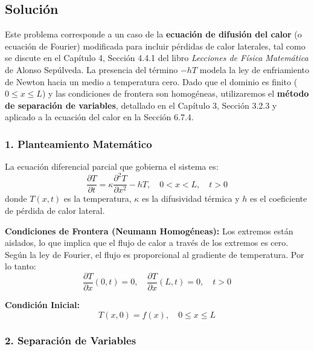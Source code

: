 \documentclass[a4paper]{article}
\begin{document}
\subsection{Solución}

Este problema corresponde a un caso de la \textbf{ecuación de difusión del calor} (o ecuación de Fourier) modificada para incluir pérdidas de calor laterales, tal como se discute en el Capítulo 4, Sección 4.4.1 del libro \textit{Lecciones de Física Matemática} de Alonso Sepúlveda. La presencia del término $-hT$ modela la ley de enfriamiento de Newton hacia un medio a temperatura cero. Dado que el dominio es finito ($0 \leq x \leq L$) y las condiciones de frontera son homogéneas, utilizaremos el \textbf{método de separación de variables}, detallado en el Capítulo 3, Sección 3.2.3 y aplicado a la ecuación del calor en la Sección 6.7.4.

\subsubsection{1. Planteamiento Matemático}

La ecuación diferencial parcial que gobierna el sistema es:
\begin{equation}
\frac{\partial T}{\partial t} = \kappa \frac{\partial^2 T}{\partial x^2} - hT, \quad 0 < x < L, \quad t > 0
\label{eq:pde}
\end{equation}
donde $T(x,t)$ es la temperatura, $\kappa$ es la difusividad térmica y $h$ es el coeficiente de pérdida de calor lateral.

\textbf{Condiciones de Frontera (Neumann Homogéneas):}
Los extremos están aislados, lo que implica que el flujo de calor a través de los extremos es cero. Según la ley de Fourier, el flujo es proporcional al gradiente de temperatura. Por lo tanto:
\begin{equation}
\frac{\partial T}{\partial x}(0, t) = 0, \quad \frac{\partial T}{\partial x}(L, t) = 0, \quad t > 0
\label{eq:bc}
\end{equation}

\textbf{Condición Inicial:}
\begin{equation}
T(x, 0) = f(x), \quad 0 \leq x \leq L
\label{eq:ic}
\end{equation}

\subsubsection{2. Separación de Variables}
\end{document}
